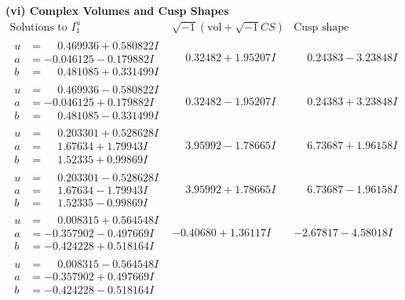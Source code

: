 \documentclass[1p]{elsarticle_modified}
\theoremstyle{definition}
\newcommand{\I}{\sqrt{-1}}
\begin{document}
\newpage\flushleft \textbf{(vi) Complex Volumes and Cusp Shapes}
$$\begin{array}{c|c|c}  
\text{Solutions to }I^u_{1}& \I (\text{vol} + \sqrt{-1}CS) & \text{Cusp shape}\\
 \hline 
\begin{aligned}
u &= \phantom{-}0.469936 + 0.580822 I \\
a &= -0.046125 - 0.179882 I \\
b &= \phantom{-}0.481085 + 0.331499 I\end{aligned}
 & \phantom{-}0.32482 + 1.95207 I & \phantom{-}0.24383 - 3.23848 I \\ \hline\begin{aligned}
u &= \phantom{-}0.469936 - 0.580822 I \\
a &= -0.046125 + 0.179882 I \\
b &= \phantom{-}0.481085 - 0.331499 I\end{aligned}
 & \phantom{-}0.32482 - 1.95207 I & \phantom{-}0.24383 + 3.23848 I \\ \hline\begin{aligned}
u &= \phantom{-}0.203301 + 0.528628 I \\
a &= \phantom{-}1.67634 + 1.79943 I \\
b &= \phantom{-}1.52335 + 0.99869 I\end{aligned}
 & \phantom{-}3.95992 - 1.78665 I & \phantom{-}6.73687 + 1.96158 I \\ \hline\begin{aligned}
u &= \phantom{-}0.203301 - 0.528628 I \\
a &= \phantom{-}1.67634 - 1.79943 I \\
b &= \phantom{-}1.52335 - 0.99869 I\end{aligned}
 & \phantom{-}3.95992 + 1.78665 I & \phantom{-}6.73687 - 1.96158 I \\ \hline\begin{aligned}
u &= \phantom{-}0.008315 + 0.564548 I \\
a &= -0.357902 - 0.497669 I \\
b &= -0.424228 + 0.518164 I\end{aligned}
 & -0.40680 + 1.36117 I & -2.67817 - 4.58018 I \\ \hline\begin{aligned}
u &= \phantom{-}0.008315 - 0.564548 I \\
a &= -0.357902 + 0.497669 I \\
b &= -0.424228 - 0.518164 I\end{aligned}

\end{array}$$
\end{document}
